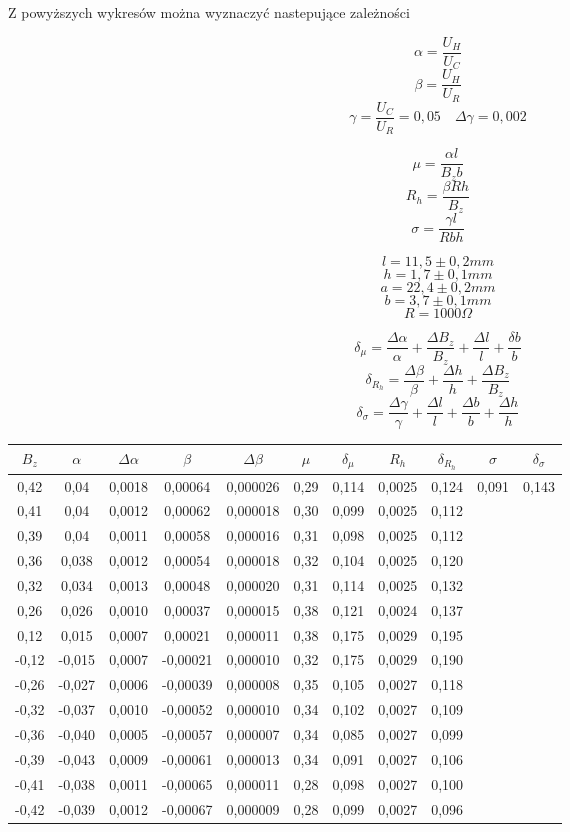 \documentclass[11pt]{article}
\begin{document}
\newpage

Z powyższych wykresów można wyznaczyć nastepujące zależności
\begin{multicols}{2}
$$ \alpha = \frac{U_H}{U_C} $$
$$ \beta = \frac{U_H}{U_R} $$
$$ \gamma = \frac{U_C}{U_R} = 0,05 \quad \Delta \gamma = 0,002 $$

$$ \mu = \frac{\alpha l}{B_zb} $$
$$ R_h = \frac{\beta R h}{B_z} $$
$$ \sigma = \frac{\gamma l}{Rbh} $$
\end{multicols}
$$ l = 11,5\pm0,2 mm $$
$$ h = 1,7\pm0,1 mm $$
$$ a = 22,4\pm0,2 mm $$
$$ b = 3,7\pm0,1 mm$$
$$ R = 1000 \Omega $$

$$ \delta_{\mu} = \frac{\Delta \alpha}{\alpha} + \frac{\Delta B_z}{B_z} + \frac{\Delta l}{l} + \frac{\delta b}{b} $$
$$ \delta_{R_h} = \frac{\Delta \beta}{\beta} + \frac{\Delta h}{h} + \frac{\Delta B_z}{B_z} $$
$$ \delta_{\sigma} = \frac{\Delta \gamma}{\gamma} + \frac{\Delta l}{l} + \frac{\Delta b}{b} + \frac{\Delta h}{h} $$


\begin{center}
\begin{tabular}{|c|c|c|c|c|c|c|c|c|c|c|}
\hline
$B_z$  & $\alpha$ & $\Delta \alpha$ & $\beta$ & $\Delta \beta$ & $\mu$ & $\delta_{\mu} $& $R_h$ & $\delta_{R_h}$ & $\sigma$ & $\delta_{\sigma}$ \\
\hline
0,42 & 0,04 & 0,0018 & 0,00064 & 0,000026 & 0,29 & 0,114 & 0,0025 & 0,124 & \multirow{14}{*}{0,091}  & \multirow{14}{*}{0,143}\\
0,41 & 0,04 & 0,0012 & 0,00062 & 0,000018 & 0,30 & 0,099 & 0,0025 & 0,112 &   &\\
0,39 & 0,04 & 0,0011 & 0,00058 & 0,000016 & 0,31 & 0,098 & 0,0025 & 0,112 &   &\\
0,36 & 0,038 & 0,0012 & 0,00054 & 0,000018 & 0,32 & 0,104 & 0,0025 & 0,120 &  &\\
0,32 & 0,034 & 0,0013 & 0,00048 & 0,000020 & 0,31 & 0,114 & 0,0025 & 0,132 &  &\\
0,26 & 0,026 & 0,0010 & 0,00037 & 0,000015 & 0,38 & 0,121 & 0,0024 & 0,137 &  &\\
0,12 & 0,015 & 0,0007 & 0,00021 & 0,000011 & 0,38 & 0,175 & 0,0029 & 0,195&   &\\
-0,12 & -0,015 & 0,0007 & -0,00021 & 0,000010 & 0,32 & 0,175 & 0,0029 & 0,190 &  &\\
-0,26 & -0,027 & 0,0006 & -0,00039 & 0,000008 & 0,35 & 0,105  & 0,0027 & 0,118 & &\\
-0,32 & -0,037 & 0,0010 & -0,00052 & 0,000010 & 0,34 & 0,102 & 0,0027 & 0,109 &  &\\
-0,36 & -0,040 & 0,0005 & -0,00057 & 0,000007 & 0,34 & 0,085 & 0,0027 & 0,099 &  &\\
-0,39 & -0,043 & 0,0009 & -0,00061 & 0,000013 & 0,34 & 0,091 & 0,0027 & 0,106 &  &\\
-0,41 & -0,038 & 0,0011 & -0,00065 & 0,000011 & 0,28 & 0,098 & 0,0027 & 0,100 &  &\\
-0,42 & -0,039 & 0,0012 & -0,00067 & 0,000009 & 0,28 & 0,099 & 0,0027 & 0,096 &  &\\
\hline
\end{tabular}
\end{center}
\end{document}
